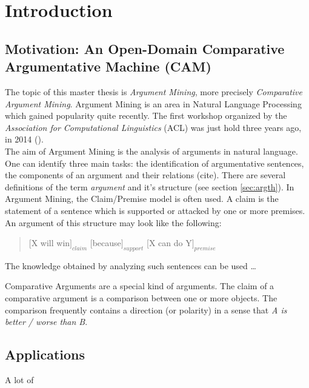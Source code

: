 \chapter{Introduction}

\section{Motivation: An Open-Domain Comparative Argumentative Machine (CAM)}


The topic of this master thesis is \emph{Argument Mining}, more precisely \emph{Comparative Argument Mining}. Argument Mining is an area in Natural Language Processing which gained popularity quite recently. The first workshop organized by the \emph{Association for Computational Linguistics} (ACL) was just hold three years ago, in 2014 (\cite{W14-21:2014}).\\
The aim of Argument Mining is the analysis of arguments in natural language. One can identify three main tasks: the identification of argumentative sentences, the components of an argument and their relations (cite). There are several definitions of the term \emph{argument} and it's structure (see section \ref{sec:argth}). In Argument Mining, the Claim/Premise model is often used. A claim is the statement of a sentence which is supported or attacked by one or more premises. An argument of this structure may look like the following:
\begin{quote}
    [X will win$]_{claim}$ [because$]_{support}$ [X can do Y$]_{premise}$
\end{quote}
The knowledge obtained by analyzing such sentences can be used \ldots\newline

Comparative Arguments are a special kind of arguments. The claim of a comparative argument is a comparison between one or more objects. The comparison frequently contains a direction (or polarity) in a sense that \emph{A is better / worse than B}.




\section{Applications}
\label{sec:applications}
A lot of

